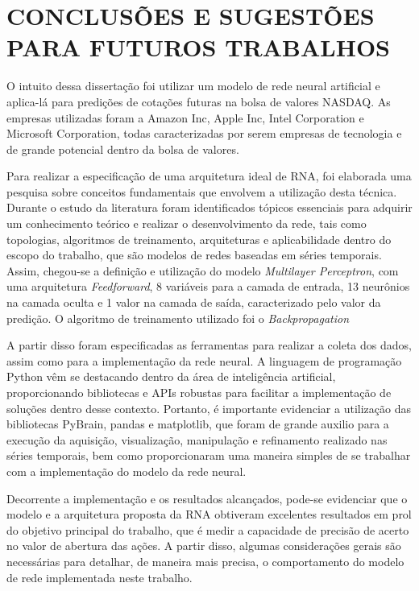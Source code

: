 
\chapter{CONCLUSÕES E SUGESTÕES PARA FUTUROS TRABALHOS}\label{ch:conclusao}
O intuito dessa dissertação foi utilizar um modelo de rede neural artificial e aplica-lá para predições de cotações futuras na bolsa de valores NASDAQ. As empresas utilizadas foram a Amazon Inc, Apple Inc, Intel Corporation e Microsoft Corporation, todas caracterizadas por serem empresas de tecnologia e de grande potencial dentro da bolsa de valores.

Para realizar a especificação de uma arquitetura ideal de RNA, foi elaborada uma pesquisa sobre conceitos fundamentais que envolvem a utilização desta técnica. Durante o estudo da literatura foram identificados tópicos essenciais para adquirir um conhecimento teórico e realizar o desenvolvimento da rede, tais como topologias, algoritmos de treinamento, arquiteturas e aplicabilidade dentro do escopo do trabalho, que são modelos de redes baseadas em séries temporais. Assim, chegou-se a definição e utilização do modelo \textit{Multilayer Perceptron}, com uma arquitetura \textit{Feedforward}, 8 variáveis para a camada de entrada, 13 neurônios na camada oculta e 1 valor na camada de saída, caracterizado pelo valor da predição. O algoritmo de treinamento utilizado foi o \textit{Backpropagation} 

A partir disso foram especificadas as ferramentas para realizar a coleta dos dados, assim como para a implementação da rede neural. A linguagem de programação Python vêm se destacando dentro da área de inteligência artificial, proporcionando bibliotecas e APIs robustas para facilitar a implementação de soluções dentro desse contexto. Portanto, é importante evidenciar a utilização das bibliotecas PyBrain, pandas e matplotlib, que foram de grande auxilio para a execução da aquisição, visualização, manipulação e refinamento realizado nas séries temporais, bem como proporcionaram uma maneira simples de se trabalhar com a implementação do modelo da rede neural.

Decorrente a implementação e os resultados alcançados, pode-se evidenciar que o modelo e a arquitetura proposta da RNA obtiveram excelentes resultados em prol do objetivo principal do trabalho, que é medir a capacidade de precisão de acerto no valor de abertura das ações. A partir disso, algumas considerações gerais são necessárias para detalhar, de maneira mais precisa, o comportamento do modelo de rede implementada neste trabalho.

